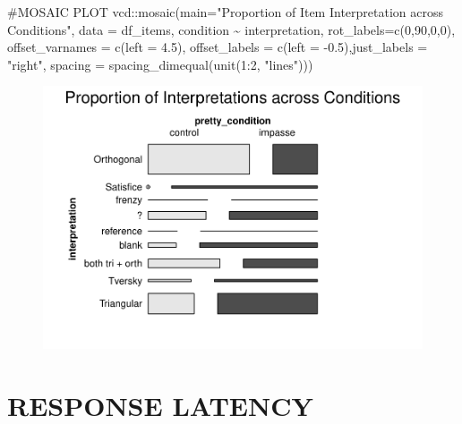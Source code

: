 \documentclass[
  letterpaper,
  DIV=11,
  numbers=noendperiod]{scrreprt}
\newenvironment{Shaded}{\begin{snugshade}}{\end{snugshade}}
\newcommand{\AttributeTok}[1]{\textcolor[rgb]{0.40,0.45,0.13}{#1}}
\newcommand{\CommentTok}[1]{\textcolor[rgb]{0.37,0.37,0.37}{#1}}
\newcommand{\DecValTok}[1]{\textcolor[rgb]{0.68,0.00,0.00}{#1}}
\newcommand{\FloatTok}[1]{\textcolor[rgb]{0.68,0.00,0.00}{#1}}
\newcommand{\FunctionTok}[1]{\textcolor[rgb]{0.28,0.35,0.67}{#1}}
\newcommand{\NormalTok}[1]{\textcolor[rgb]{0.00,0.23,0.31}{#1}}
\newcommand{\SpecialCharTok}[1]{\textcolor[rgb]{0.37,0.37,0.37}{#1}}
\newcommand{\StringTok}[1]{\textcolor[rgb]{0.13,0.47,0.30}{#1}}
\begin{document}
\begin{Shaded}
\begin{Highlighting}[]
\CommentTok{\#MOSAIC PLOT}
\NormalTok{vcd}\SpecialCharTok{::}\FunctionTok{mosaic}\NormalTok{(}\AttributeTok{main=}\StringTok{"Proportion of Item Interpretation across Conditions"}\NormalTok{,}
            \AttributeTok{data =}\NormalTok{ df\_items, condition }\SpecialCharTok{\textasciitilde{}}\NormalTok{ interpretation, }\AttributeTok{rot\_labels=}\FunctionTok{c}\NormalTok{(}\DecValTok{0}\NormalTok{,}\DecValTok{90}\NormalTok{,}\DecValTok{0}\NormalTok{,}\DecValTok{0}\NormalTok{), }
            \AttributeTok{offset\_varnames =} \FunctionTok{c}\NormalTok{(}\AttributeTok{left =} \FloatTok{4.5}\NormalTok{), }\AttributeTok{offset\_labels =} \FunctionTok{c}\NormalTok{(}\AttributeTok{left =} \SpecialCharTok{{-}}\FloatTok{0.5}\NormalTok{),}\AttributeTok{just\_labels =} \StringTok{"right"}\NormalTok{,}
            \AttributeTok{spacing =} \FunctionTok{spacing\_dimequal}\NormalTok{(}\FunctionTok{unit}\NormalTok{(}\DecValTok{1}\SpecialCharTok{:}\DecValTok{2}\NormalTok{, }\StringTok{"lines"}\NormalTok{))) }
\end{Highlighting}
\end{Shaded}

\begin{figure}[H]

{\centering \includegraphics{analysis/SGC3A/3_sgc3A_description_files/figure-pdf/VIS-ITEM-INTERPRETATION-2.pdf}

}

\end{figure}

\hypertarget{response-latency}{%
\section{RESPONSE LATENCY}\label{response-latency}}
\end{document}
